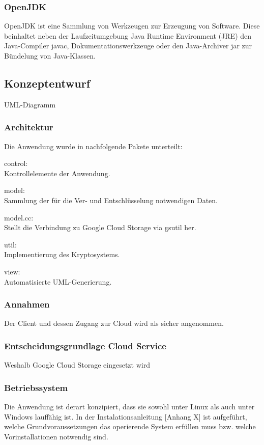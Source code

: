 \documentclass[12pt,a4paper,bibliography=totocnumbered,listof=totocnumbered]{scrartcl}
\begin{document}
\subsubsection{OpenJDK}
OpenJDK ist eine Sammlung von Werkzeugen zur Erzeugung von Software. Diese beinhaltet neben der Laufzeitumgebung Java Runtime Environment (JRE) den Java-Compiler javac, Dokumentationswerkzeuge oder den Java-Archiver jar zur Bündelung von Java-Klassen.
\subsection{Konzeptentwurf}
UML-Diagramm
\subsubsection{Architektur}
Die Anwendung wurde in nachfolgende Pakete unterteilt:
\begin{compactitem}
	\item control:\\
Kontrollelemente der Anwendung.
	\item model:\\
Sammlung der für die Ver- und Entschlüsselung notwendigen Daten.
	\item model.cc:\\
Stellt die Verbindung zu Google Cloud Storage via gsutil her.
	\item util:\\
Implementierung des Kryptosystems.
	\item view:\\
Automatisierte UML-Generierung.
\end{compactitem}
\subsubsection{Annahmen}
Der Client und dessen Zugang zur Cloud wird als sicher angenommen.
\subsubsection{Entscheidungsgrundlage Cloud Service}
Weshalb Google Cloud Storage eingesetzt wird
\subsubsection{Betriebssystem}
Die Anwendung ist derart konzipiert, dass sie sowohl unter Linux als auch unter Windows lauffähig ist. In der Instalationsanleitung [Anhang X] ist aufgeführt, welche Grundvoraussetzungen das operierende System erfüllen muss bzw. welche Vorinstallationen notwendig sind.
\end{document}
